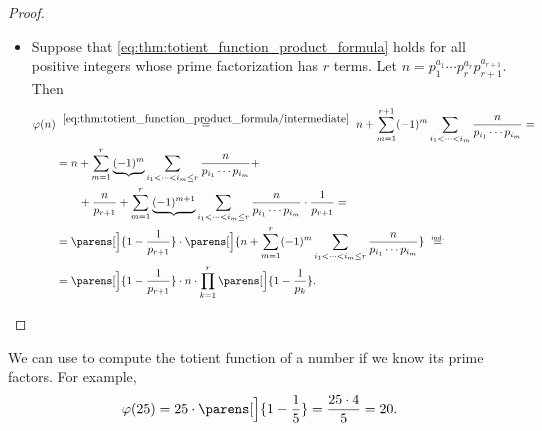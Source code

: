 \begin{proof}
\begin{itemize}
    \item Suppose that \eqref{eq:thm:totient_function_product_formula} holds for all positive integers whose prime factorization has \( r \) terms. Let \( n = p_1^{a_1} \cdots p_r^{a_r} p_{r+1}^{a_{r+1}} \). Then
    \begin{align*}
      \varphi(n)
      &\reloset{\eqref{eq:thm:totient_function_product_formula/intermediate}} =
      n + \sum_{m=1}^{r+1} (-1)^m \sum_{i_1 < \cdots < i_m} \frac n {p_{i_1} \cdots p_{i_m}}
      = \\ &=
      n + \sum_{m=1}^r \underbrace{(-1)^m} \sum_{i_1 < \cdots < i_m \leq r} \frac n {p_{i_1} \cdots p_{i_m}} + \\ &\quad\quad + \frac n {p_{r+1}} + \sum_{m=1}^r \underbrace{(-1)^{m+1}} \sum_{i_1 < \cdots < i_m \leq r} \frac n {p_{i_1} \cdots p_{i_m}} \cdot \frac 1 {p_{r+1}}
      = \\ &=
      \parens[\Big]{ 1 - \frac 1 {p_{r+1}} } \cdot \parens[\Big]{ n + \sum_{m=1}^r (-1)^m \sum_{i_1 < \cdots < i_m \leq r} \frac n {p_{i_1} \cdots p_{i_m}} }
      \reloset {\T{ind.}} = \\ &=
      \parens[\Big]{ 1 - \frac 1 {p_{r+1}} } \cdot n \cdot \prod_{k=1}^r \parens[\Big]{ 1 - \frac 1 {p_k} }.
    \end{align*}
  \end{itemize}
\end{proof}

\begin{example}\label{ex:thm:totient_function_product_formula} We can use  to compute the totient function of a number if we know its prime factors. For example,
  \begin{equation*}
    \varphi(25) = 25 \cdot \parens[\Big]{ 1 - \frac 1 5 } = \frac {25 \cdot 4} 5 = 20.
  \end{equation*}
\end{example}

